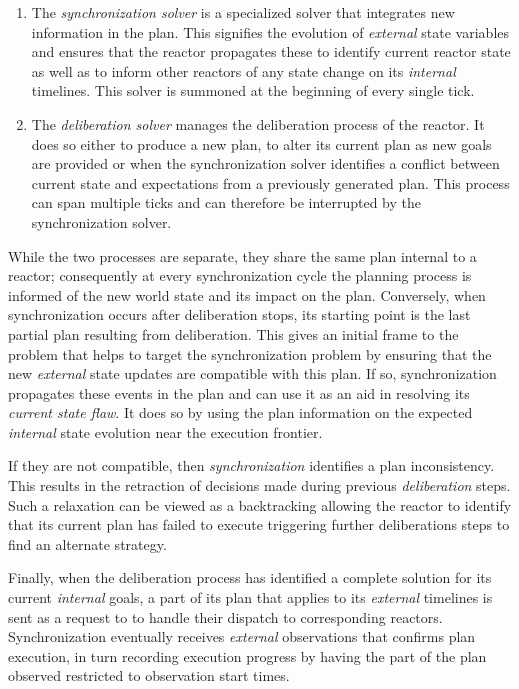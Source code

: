 \begin{enumerate}

\item The \emph{synchronization solver} is a specialized \eu solver
  that integrates new information in the plan. This signifies the
  evolution of \emph{external} state variables and ensures that the
  reactor propagates these to identify current reactor state as well
  as to inform other reactors of any state change on its
  \emph{internal} timelines. This solver is summoned at the beginning
  of every single tick.

\item The \emph{deliberation solver} manages the deliberation process
  of the reactor. It does so either to produce a new plan, to alter
  its current plan as new goals are provided or when the
  synchronization solver identifies a conflict between current state
  and expectations from a previously generated plan. This process can
  span multiple ticks and can therefore be interrupted by the
  synchronization solver.

\end{enumerate}

While the two processes are separate, they share the same plan
internal to a reactor; consequently at every synchronization cycle the
planning process is informed of the new world state and its impact on
the plan. Conversely, when synchronization occurs after deliberation
stops, its starting point is the last partial plan resulting from
deliberation. This gives an initial frame to the problem that helps to
target the synchronization problem by ensuring that the new {\em
  external} state updates are compatible with this plan. If so,
synchronization propagates these events in the plan and can use it as
an aid in resolving its {\em current state flaw}. It does so by using
the plan information on the expected {\em internal} state evolution
near the execution frontier.

If they are not compatible, then {\em synchronization} identifies a
plan inconsistency. This results in the retraction of decisions made
during previous {\em deliberation} steps.  Such a relaxation can be
viewed as a backtracking allowing the reactor to identify that its
current plan has failed to execute triggering further deliberations
steps to find an alternate strategy.

Finally, when the deliberation process has identified a complete
solution for its current {\em internal} goals, a part of its plan that
applies to its {\em external} timelines is sent as a request to \rx to
handle their dispatch to corresponding reactors.  Synchronization
eventually receives {\em external } observations that confirms plan
execution, in turn recording execution progress by having the part of
the plan observed restricted to observation start times.

